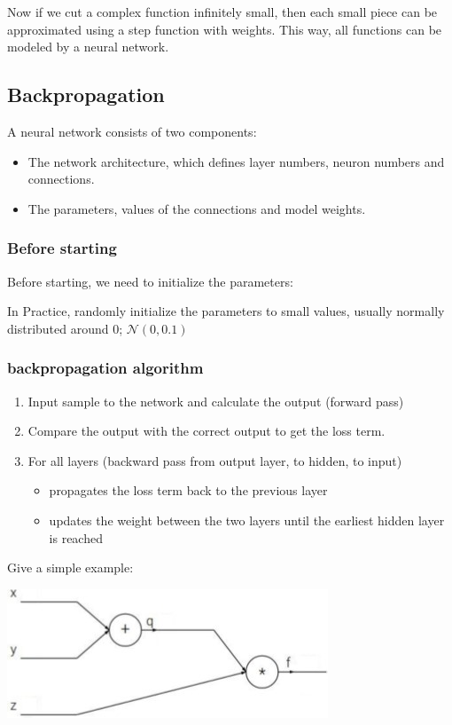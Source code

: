 \documentclass[letterpaper,12pt]{article}
\begin{document}
Now if we cut a complex function infinitely small, then each small piece can be approximated using a step function with weights. This way, all functions can be modeled by a neural network. 

\subsection{Backpropagation}

A neural network consists of two components:
\begin{itemize}
    \item The network architecture, which defines layer numbers, neuron numbers and connections.
    \item The parameters, values of the connections and model weights.
\end{itemize}

\subsubsection{Before starting}
Before starting, we need to initialize the parameters:

In Practice, randomly initialize the parameters to small values, usually normally distributed around 0; $\mathcal{N}(0,0.1)$

\subsubsection{backpropagation algorithm}

\begin{enumerate}
    \item Input sample to the network and calculate the output (forward pass)
    \item Compare the output with the correct output to get the loss term.
    \item For all layers (backward pass from output layer, to hidden, to input)\begin{itemize}
        \item propagates the loss term back to the previous layer
        \item updates the weight between the two layers until the earliest hidden layer is reached 
    \end{itemize}
\end{enumerate}

Give a simple example:

\includegraphics*{./Image/Backpropagation example.jpg}
\end{document}
